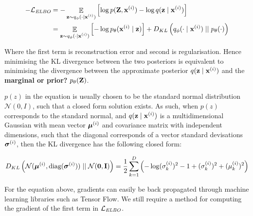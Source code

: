 	
	
	
	
	\begin{equation}
		\begin{aligned}
			- \lelbo & = - \elbo \\  
			& = \elboexplicit \label{eq:elboexplicit} \\
		\end{aligned}	
	\end{equation} %
	
	Where the first term is reconstruction error and second is regularisation. Hence minimising the KL divergence between the two posteriors is equivalent to minimising the divergence between the approximate posterior $\qzx$ and the \textbf{marginal or prior?} $\pz$.
	
	$p(z)$ in the equation is usually chosen to be the standard normal distribution $\mathcal{N}(0, I)$, such that a closed form solution exists. As such, when $p(z)$ corresponds to the standard normal, and $\qzx$ is a multidimensional Gaussian with mean vector $\mui$ and covariance matrix with independent dimensions, such that the diagonal corresponds of a vector standard devisations $\sigmai$, then the KL divergence has the following closed form:
	
	\begin{equation}	
		\kl{\normal}{\standardnormal} = \latentspaceconstraintclosedform
	\end{equation}
	
	For the equation above, gradients can easily be back propagated through machine learning libraries such as Tensor Flow. We still require a method for computing the gradient of the first term in $\lelbo$. %
	
	
	
	
	
	
	
	
	
	
	
	
	
